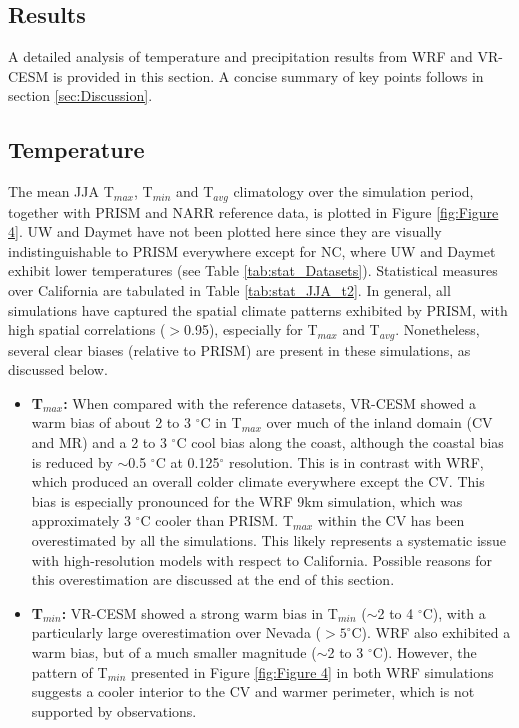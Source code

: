\documentclass[ms]{agutex}   %
\begin{document}
\begin{article}
\section{Results}

A detailed analysis of temperature and precipitation results from WRF and VR-CESM is provided in this section.  A concise summary of key points follows in section \ref{sec:Discussion}.

\subsection{Temperature}

The mean JJA T$_{max}$, T$_{min}$ and T$_{avg}$ climatology over the simulation period, together with PRISM and NARR reference data, is plotted in Figure \ref{fig:Figure 4}. UW and Daymet have not been plotted here since they are visually indistinguishable to PRISM everywhere except for NC, where UW and Daymet exhibit lower temperatures (see Table \ref{tab:stat_Datasets}).  Statistical measures over California are tabulated in Table \ref{tab:stat_JJA_t2}. In general, all simulations have captured the spatial climate patterns exhibited by PRISM, with high spatial correlations ($>$0.95), especially for T$_{max}$ and T$_{avg}$.  Nonetheless, several clear biases (relative to PRISM) are present in these simulations, as discussed below.

\begin{itemize}
\item{} \textbf{T$_{max}$:}  When compared with the reference datasets, VR-CESM showed a warm bias of about 2 to 3 $^\circ$C in T$_{max}$ over much of the inland domain (CV and MR) and a 2 to 3 $^\circ$C cool bias along the coast, although the coastal bias is reduced by $\sim$0.5 $^\circ$C at 0.125$^\circ$ resolution. This is in contrast with WRF, which produced an overall colder climate everywhere except the CV.  This bias is especially pronounced for the WRF 9km simulation, which was approximately 3 $^\circ$C cooler than PRISM. T$_{max}$ within the CV has been overestimated by all the simulations. This likely represents a systematic issue with high-resolution models with respect to California.  Possible reasons for this overestimation are discussed at the end of this section.


\item{} \textbf{T$_{min}$:}  VR-CESM showed a strong warm bias in T$_{min}$ ($\sim$2 to 4 $^\circ$C), with a particularly large overestimation over Nevada ($> 5 ^\circ$C). WRF also exhibited a warm bias, but of a much smaller magnitude ($\sim$2 to 3 $^\circ$C). However, the pattern of T$_{min}$ presented in Figure \ref{fig:Figure 4} in both WRF simulations suggests a cooler interior to the CV and warmer perimeter, which is not supported by observations.


\end{itemize}
\end{article}
\end{document}
